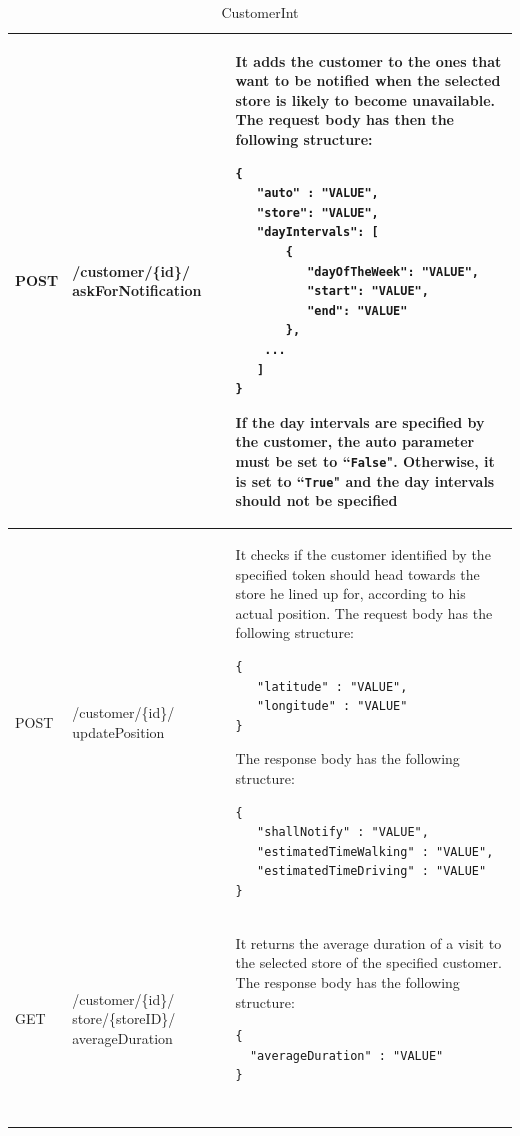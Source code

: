 \documentclass[a4paper,oneside,11pt]{book}
\begin{document}
\begin{longtable}[c] { |>{\centering\arraybackslash}P{0.11\textwidth}|>{\centering\arraybackslash\ttfamily}H{0.23\textwidth}|H{0.50\textwidth}| }
        POST & /customer/\{id\}/ askForNotification & It adds the customer to the ones that want to be notified when the selected store is likely to become unavailable. The request body has then the following structure:
        \begin{lstlisting}[language=jsonDD]
{
   "auto" : "VALUE",
   "store": "VALUE",
   "dayIntervals": [
       {
          "dayOfTheWeek": "VALUE",
          "start": "VALUE",
          "end": "VALUE"
       }, 
    ...
   ]
}
        \end{lstlisting} If the day intervals are specified by the customer, the auto parameter must be set to ``\texttt{False}". Otherwise, it is set to ``\texttt{True}" and the day intervals should not be specified \\ \hline
        POST & /customer/\{id\}/ updatePosition & It checks if the customer identified by the specified token should head towards the store he lined up for, according to his actual position. The request body has the following structure:
        \begin{lstlisting}[language=jsonDD]
{
   "latitude" : "VALUE",
   "longitude" : "VALUE"
}
        \end{lstlisting} 
         The response body has the following structure:
        \begin{lstlisting}[language=jsonDD]
{
   "shallNotify" : "VALUE",
   "estimatedTimeWalking" : "VALUE",
   "estimatedTimeDriving" : "VALUE"
}
        \end{lstlisting} 
        \\ \hline
        GET & /customer/\{id\}/ store/\{storeID\}/ averageDuration & It returns the average duration of a visit to the selected store of the specified customer. The response body has the following structure: 
        \begin{lstlisting}[language=jsonDD]
{
  "averageDuration" : "VALUE"
}
    
        \end{lstlisting} \\ \hline
        \caption{CustomerInt}
        \label{table:customer_int}
    \end{longtable}
    \pagebreak
\end{document}
